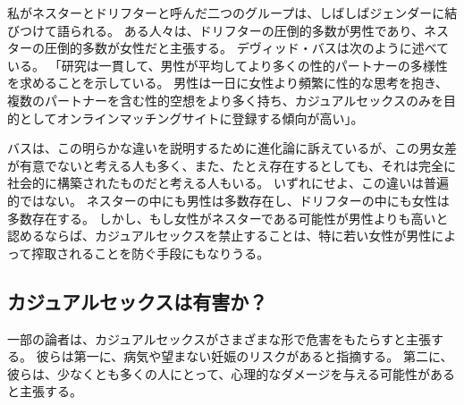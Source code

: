 \documentclass[paper=a4,book,openany]{jlreq}
\begin{document}
私がネスターとドリフターと呼んだ二つのグループは、しばしばジェンダーに結びつけて語られる。
ある人々は、ドリフターの圧倒的多数が男性であり、ネスターの圧倒的多数が女性だと主張する\citep[cf.][]{regnerus12:_cont_matin_mark}。
デヴィッド・バスは次のように述べている。
「研究は一貫して、男性が平均してより多くの性的パートナーの多様性を求めることを示している。
男性は一日に女性より頻繁に性的な思考を抱き、複数のパートナーを含む性的空想をより多く持ち、カジュアルセックスのみを目的としてオンラインマッチングサイトに登録する傾向が高い」\citep{buss16:_what_do_you}。

バスは、この明らかな違いを説明するために進化論に訴えているが、この男女差が有意でないと考える人も多く、また、たとえ存在するとしても、それは完全に社会的に構築されたものだと考える人もいる。
いずれにせよ、この違いは普遍的ではない。
ネスターの中にも男性は多数存在し、ドリフターの中にも女性は多数存在する。
しかし、もし女性がネスターである可能性が男性よりも高いと認めるならば、カジュアルセックスを禁止することは、特に若い女性が男性によって搾取されることを防ぐ手段にもなりうる。

\subsection{カジュアルセックスは有害か？}

一部の論者は、カジュアルセックスがさまざまな形で危害をもたらすと主張する。
彼らは第一に、病気や望まない妊娠のリスクがあると指摘する。
第二に、彼らは、少なくとも多くの人にとって、心理的なダメージを与える可能性があると主張する。
\end{document}
